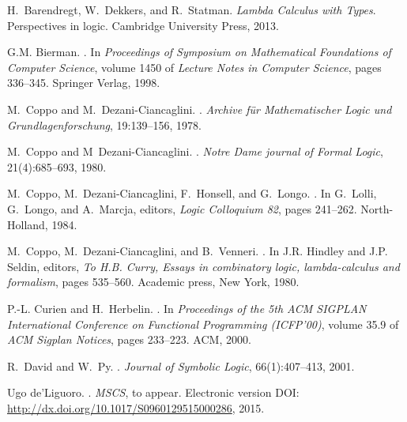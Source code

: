 \documentclass{CSML}
\begin{document}
\begin{thebibliography}{10}
H.~Barendregt, W.~Dekkers, and R.~Statman.
\newblock \emph{Lambda Calculus with Types}.
\newblock Perspectives in logic. Cambridge University Press, 2013.

G.M. Bierman.
.
\newblock In \emph{Proceedings of Symposium on Mathematical Foundations of
 Computer Science}, volume 1450 of \emph{Lecture Notes in Computer Science},
 pages 336--345. Springer Verlag, 1998.

M.~Coppo and M.~Dezani{-}Ciancaglini.
.
\newblock \emph{Archive f\"ur Mathematischer Logic und Grundlagenforschung},
 19:139--156, 1978.

M.~Coppo and M~{Dezani-Ciancaglini}.
.
\newblock \emph{Notre Dame journal of Formal Logic}, 21(4):685--693, 1980.

M.~Coppo, M.~{Dezani-Ciancaglini}, F.~Honsell, and G.~Longo.
.
\newblock In G.~Lolli, G.~Longo, and A.~Marcja, editors, \emph{Logic Colloquium
 82}, pages 241--262. North-Holland, 1984.

M.~Coppo, M.~{Dezani-Ciancaglini}, and B.~Venneri.
.
\newblock In J.R. Hindley and J.P. Seldin, editors, \emph{To H.B. Curry, Essays
 in combinatory logic, lambda-calculus and formalism}, pages 535--560.
 Academic press, New York, 1980.

P.-L. Curien and H.~Herbelin.
.
\newblock In \emph{Proceedings of the 5th ACM SIGPLAN International Conference
 on Functional Programming (ICFP'00)}, volume 35.9 of \emph{ACM Sigplan
 Notices}, pages 233--223. ACM, 2000.

R.~David and W.~Py.
.
\newblock \emph{Journal of Symbolic Logic}, 66(1):407--413, 2001.

Ugo de'Liguoro.
.
\newblock \emph{MSCS},
\newblock to appear. Electronic version DOI: \url{http://dx.doi.org/10.1017/S0960129515000286},
2015.


\end{thebibliography}
\end{document}

